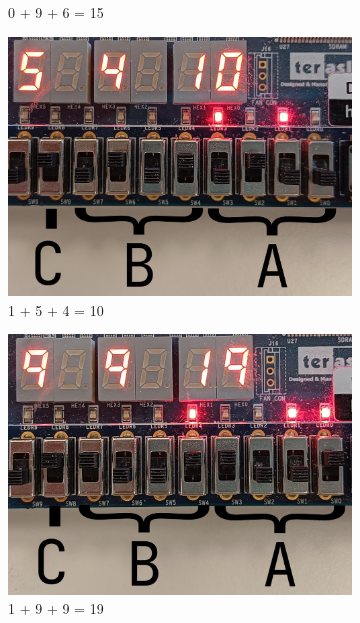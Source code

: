 \documentclass{article}
\begin{document}
\begin{figure}[h]
\begin{subfigure}{0.4\textwidth}
        \caption{0 + 9 + 6 = 15}
        \label{fig:T04pic2}
    \end{subfigure}
    \begin{subfigure}{0.4\textwidth}
        \centering
        \includegraphics[width=1\textwidth]{Figures/Part4-1_5_4.jpg}
        \caption{1 + 5 + 4 = 10}
        \label{fig:T04pic3}
    \end{subfigure}
    \hfill
    \begin{subfigure}{0.4\textwidth}
        \centering
        \includegraphics[width=1\textwidth]{Figures/Part4-1_9_9.jpg}
        \caption{1 + 9 + 9 = 19}
        \label{fig:T04pic4}
    \end{subfigure}
    \begin{subfigure}{0.4\textwidth}

\end{subfigure}
\end{figure}
\end{document}
